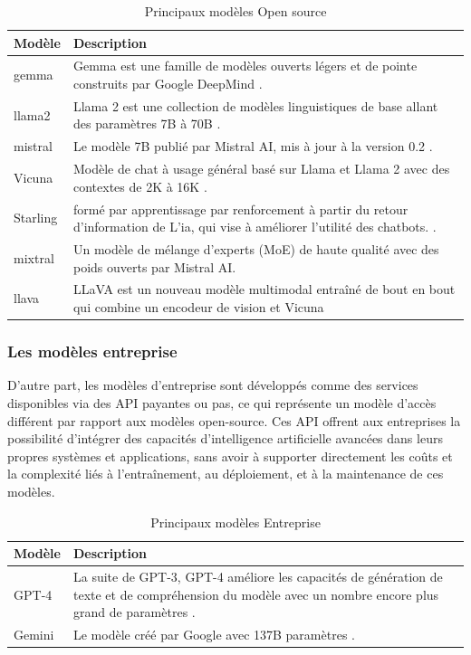 \begin{table}[H]
\centering
\begin{tabular}{|l|p{12cm}|}
\hline
\textbf{Modèle} & \textbf{Description} \\ \hline
gemma & Gemma est une famille de modèles ouverts légers et de pointe construits par Google DeepMind \cite{gemma_2024}. \\ \hline
llama2  & Llama 2 est une collection de modèles linguistiques de base allant des paramètres 7B à 70B \cite{touvron2023llama}. \\ \hline
mistral & Le modèle 7B publié par Mistral AI, mis à jour à la version 0.2 \cite{jiang2023mistral}. \\ \hline
Vicuna & Modèle de chat à usage général basé sur Llama et Llama 2 avec des contextes de 2K à 16K \cite{vicuna2023}. \\ \hline
Starling & formé par apprentissage par renforcement à partir du retour d'information de L'\ac{ia}, qui vise à améliorer l'utilité des chatbots. \cite{starling2023}. \\ \hline
mixtral & Un modèle de mélange d'experts (MoE) de haute qualité avec des poids ouverts par Mistral AI. \\ \hline
llava & LLaVA est un nouveau modèle multimodal entraîné de bout en bout qui combine un encodeur de vision et Vicuna \\ \hline
\end{tabular}
\caption{Principaux modèles Open source}
\label{table:llm-models}
\end{table}


\subsubsection{Les modèles entreprise}

D'autre part, les modèles d'entreprise sont développés comme des services disponibles via des API payantes ou pas, ce qui représente un modèle d'accès différent par rapport aux modèles open-source. Ces API offrent aux entreprises la possibilité d'intégrer des capacités d'intelligence artificielle avancées dans leurs propres systèmes et applications, sans avoir à supporter directement les coûts et la complexité liés à l'entraînement, au déploiement, et à la maintenance de ces modèles.
 
\begin{table}[H]
\centering
\begin{tabular}{|l|p{14cm}|}
\hline
\textbf{Modèle} & \textbf{Description} \\ \hline
GPT-4 & La suite de GPT-3, GPT-4 améliore les capacités de génération de texte et de compréhension du modèle avec un nombre encore plus grand de paramètres \cite{openai2023gpt4}. \\ \hline
Gemini & Le modèle créé par Google avec 137B paramètres \cite{geminiteam2023gemini}. \\ \hline
\end{tabular}
\caption{Principaux modèles Entreprise}
\label{table:llm-models-closed}
\end{table}




